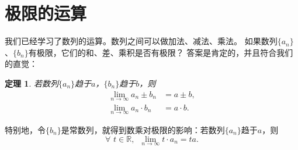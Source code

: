 \documentclass[12pt,UTF8]{ctexbook}
\newtheorem{tm}{定理}[section]
\begin{document}
\section{极限的运算}
我们已经学习了数列的运算。数列之间可以做加法、减法、乘法。
如果数列$\{a_n\}$、$\{b_n\}$有极限，它们的和、差、乘积是否有极限？
答案是肯定的，并且符合我们的直觉：
\begin{tm}
    若数列$\{a_n\}$趋于$a$，$\{b_n\}$趋于$b$，则
    \begin{align*}
        \lim_{n\to\infty} a_n \pm b_n &= a \pm b,  \\
        \lim_{n\to\infty} a_n \cdot b_n &= a \cdot b.  
    \end{align*}
\end{tm}
特别地，令$\{b_n\}$是常数列，就得到数乘对极限的影响：若数列$\{a_n\}$趋于$a$，则
$$ \forall \,\, t \in \mathbb{R}, \,\,\,  \lim_{n\to\infty} t \cdot a_n = ta. $$
\end{document}
